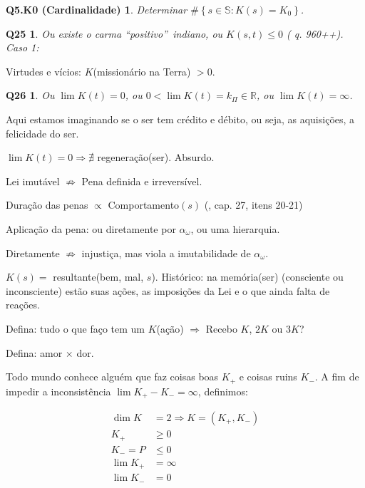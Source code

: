 \documentclass[12pt,a4paper]{article}
\begin{document}
			\newtheorem{Q5.K0}{Q5.K0 (Cardinalidade)}
			\begin{Q5.K0} Determinar $ \#\left\{s \in \mathbb{S} : K(s) = K_0 \right\}$.
			\end{Q5.K0}

			\newtheorem{Q25}{Q25}
			\begin{Q25} Ou existe o carma \textquotedblleft positivo\textquotedblright\, indiano, ou $ K(s, t) \le 0 $ (\cite{le} q. 960++). Caso 1:
			\end{Q25}

			Virtudes e v\'icios: $K$(mission\'ario na Terra\cite{Terra}) $ > 0$.

			\newtheorem{Q26}{Q26}
			\begin{Q26} Ou $ \lim K(t) = 0 $, ou $ 0 < \lim K(t) = k_\Pi \in \mathbb{R} $, ou $ \lim K(t) = \infty $.
			\end{Q26}

			Aqui estamos imaginando se o ser tem cr\'edito e d\'ebito, ou seja, as aquisi\c{c}\~oes, a felicidade do ser.

			$ \lim K(t) = 0 \Rightarrow \nexists $ regenera\c{c}\~ao(ser). Absurdo.

			Lei imut\'avel $ \nRightarrow $ Pena definida e irrevers\'ivel.

			Dura\c{c}\~ao das penas $ \propto $ Comportamento$(s)$ (\cite{ese}, cap. 27, itens 20-21)

			Aplica\c{c}\~ao da pena: ou diretamente por $\alpha_\omega$, ou uma hierarquia.

			Diretamente $\nRightarrow$ injusti\c{c}a, mas viola a imutabilidade de $\alpha_\omega$.

			$K(s) = $ resultante(bem, mal, $s$). Hist\'orico: na mem\'oria(ser) (consciente ou inconsciente\cite{Freud}) est\~ao suas a\c{c}\~oes, as imposi\c{c}\~oes da Lei e o que ainda falta de rea\c{c}\~oes.

			Defina: tudo o que fa\c{c}o tem um $K$(a\c{c}\~ao) $\Rightarrow$ Recebo $K$, $2K$ ou $3K$?

			Defina: amor $\times$ dor.

			Todo mundo conhece algu\'em que faz coisas boas $K_+$ e coisas ruins $K_-$. A fim de impedir a inconsist\^encia $\lim K_+ - K_- = \infty$, definimos:

			\begin{align*}
				\dim K &= 2 \Rightarrow K = (K_+, K_-) \\
				K_+ &\ge 0 \\
				K_- = P &\le 0 \\
				\lim K_+ &= \infty \\
				\lim K_- &= 0
			\end{align*}
\end{document}
